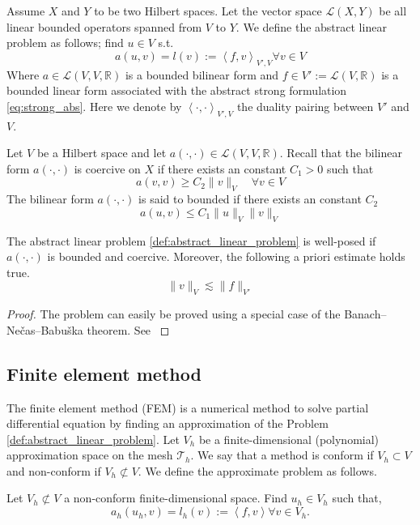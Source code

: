 \begin{problem}
    \label{def:abstract_linear_problem}
    Assume $X$ and $Y$  to be two Hilbert spaces. Let the vector space $\mathcal{L}( X,Y)  $ be all linear bounded operators spanned from $V$ to $Y$. We define the abstract linear problem as follows; find $u \in V$ s.t. \[
    a( u,v)  = l(v ) := \left<f,v \right>_{V' , V}  \forall v \in V
    \]
    Where $a \in  \mathcal{L} ( V, V,\mathbb{R} ) $ is a bounded bilinear form and $f \in V':= \mathcal{L} ( V,\mathbb{R} )  $ is a bounded linear form associated with the abstract strong formulation \eqref{eq:strong_abs}. Here we denote by $\left<\cdot ,\cdot  \right>_{V',V} $ the duality pairing between $V'$ and $V$.

\end{problem}


\begin{definition}
    \label{def:coercivity}
    Let $V$ be a Hilbert space and let $a( \cdot ,\cdot )  \in  \mathcal{L} ( V, V,\mathbb{R} )  $. Recall that the bilinear form $a( \cdot ,\cdot ) $ is coercive on $X$ if there exists an constant $C_{1} > 0 $ such that \[
     a( v,v) \ge  C_{2} \| v \|_{ V }^{  } \quad  \forall v \in  V
    \]
     The bilinear form $a( \cdot ,\cdot ) $ is said to bounded if there exists an constant $C_{2}$  \[
    a( u,v)  \le C_{1} \| u \|_{ V }^{  }  \| v \|_{V }^{  }
    \]
\end{definition}


\begin{lemma}
    \label{def:lax-milgram}
    The abstract linear problem \ref{def:abstract_linear_problem} is well-posed if $a(\cdot , \cdot  ) $ is bounded and coercive. Moreover, the following a priori estimate holds true.\[
    \| v \|_{ V }^{  } \lesssim  \| f \|_{ V'  }^{  }
    \]
\end{lemma}
\begin{proof}
    The problem can easily be proved using a special case of the Banach–Nečas–Babuška theorem. See \cite[Lemma 1.4]{pietro2012}
\end{proof}



\subsection{Finite element method}%
\label{sub:finite_element_method}


The finite element method (FEM) is a numerical method to solve partial differential equation by finding an approximation of the Problem \ref{def:abstract_linear_problem}.  Let $V_{h}$ be a finite-dimensional (polynomial) approximation space on the mesh
$\mathcal{T} _{h}$. We say that a method is conform if $V_{h}\subset V $ and non-conform if $V _{h} \not\subset V$. We define the approximate problem as follows.
\begin{problem}
    \label{def:approx_problem}
    Let $V_{h} \not\subset V$ a non-conform finite-dimensional space. Find  $u_{h} \in V_{h}$ such that, \[
    a_{h}(u_{h},v ) = l_{h}( v) :=  \left<f,v \right>   \forall v \in V_{h}.
    \]
\end{problem}

